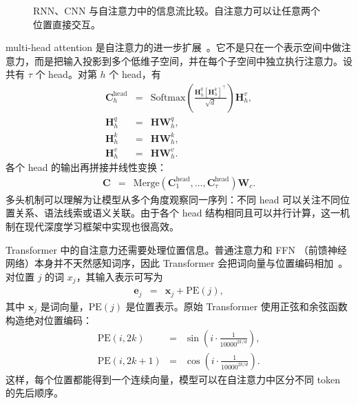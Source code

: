 
\begin{figure}[htbp]
  \centering
  
  \caption{RNN、CNN 与自注意力中的信息流比较。自注意力可以让任意两个位置直接交互。}
  \label{fig:nlpbook-information-flow}
\end{figure}

multi-head attention 是自注意力的进一步扩展~\cite{VaswaniEtAl2017Transformer}。它不是只在一个表示空间中做注意力，而是把输入投影到多个低维子空间，并在每个子空间中独立执行注意力。设共有 $\tau$ 个 head。对第 $h$ 个 head，有
\begin{eqnarray}
\mathbf{C}_{h}^{\mathrm{head}}
& = &
\mathrm{Softmax}
\left(
\frac{\mathbf{H}_{h}^{q}[\mathbf{H}_{h}^{k}]^{\top}}{\sqrt{d}}
\right)
\mathbf{H}_{h}^{v},\\
\mathbf{H}_{h}^{q} &=& \mathbf{H}\mathbf{W}_{h}^{q},\\
\mathbf{H}_{h}^{k} &=& \mathbf{H}\mathbf{W}_{h}^{k},\\
\mathbf{H}_{h}^{v} &=& \mathbf{H}\mathbf{W}_{h}^{v}.
\end{eqnarray}
各个 head 的输出再拼接并线性变换：
\begin{eqnarray}
\mathbf{C}
& = &
\mathrm{Merge}
(\mathbf{C}_{1}^{\mathrm{head}},\ldots,\mathbf{C}_{\tau}^{\mathrm{head}})
\mathbf{W}_{c}.
\end{eqnarray}
多头机制可以理解为让模型从多个角度观察同一序列：不同 head 可以关注不同位置关系、语法线索或语义关联。由于各个 head 结构相同且可以并行计算，这一机制在现代深度学习框架中实现也很高效。

Transformer 中的自注意力还需要处理位置信息。普通注意力和 FFN （前馈神经网络）本身并不天然感知词序，因此 Transformer 会把词向量与位置编码相加~\cite{VaswaniEtAl2017Transformer}。对位置 $j$ 的词 $x_j$，其输入表示可写为
\begin{eqnarray}
\mathbf{e}_j
& = &
\mathbf{x}_j+\mathrm{PE}(j),
\end{eqnarray}
\noindent 其中 $\mathbf{x}_j$ 是词向量，$\mathrm{PE}(j)$ 是位置表示。原始 Transformer 使用正弦和余弦函数构造绝对位置编码：
\begin{eqnarray}
\mathrm{PE}(i,2k)
& = &
\sin
\left(
i\cdot\frac{1}{10000^{2k/d}}
\right),\\
\mathrm{PE}(i,2k+1)
& = &
\cos
\left(
i\cdot\frac{1}{10000^{2k/d}}
\right).
\end{eqnarray}
这样，每个位置都能得到一个连续向量，模型可以在自注意力中区分不同 token 的先后顺序。

